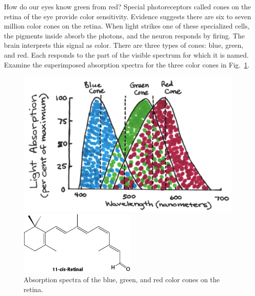 How do our eyes know green from red?  Special photoreceptors called cones on the retina of the eye provide color sensitivity.  Evidence suggests there are six to seven million color cones on the retina.  When light strikes one of these specialized cells, the pigments inside absorb the photons, and the neuron responds by firing.  The brain interprets this signal as color.  
There are three types of cones: blue, green, and red.  Each responds to the part of the visible spectrum for which it is named.  Examine the superimposed absorption spectra for the three color cones in Fig.~\ref{Fig6-9}.
\begin{figure}[h]
	\centering
	\begin{minipage}[c]{0.5\textwidth}
	\includegraphics[width=\textwidth]{./figures/Topic6/Fig6-9a.jpg}
	\end{minipage}
	\begin{minipage}[c]{0.3\textwidth}
	\includegraphics[width=\textwidth]{./figures/Topic6/Fig6-9b.png}
	\end{minipage}
	\caption{Absorption spectra of the blue, green, and red color cones on the retina.}
	\label{Fig6-9}
\end{figure}
